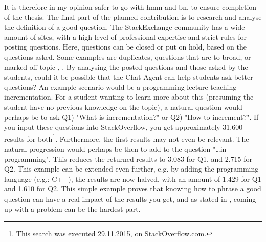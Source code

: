 It is therefore in my opinion safer to go with \gls{hmm} and \gls{bn}, to ensure completion of the thesis.
\vspace{0.5em}\newline
The final part of the planned contribution is to research and analyse the definition of a good question. The StackExchange community has a wide amount of sites, with a high level 
of professional expertise and strict rules for posting questions. Here, questions can be closed or put on hold, based on the questions asked. Some examples are duplicates, questions 
that are to broad, or marked off-topic \cite{Stackoverflow.com2015}, \cite{CommunityWiki2015}. By analysing the posted questions and those asked by the students, could it be possible 
that the Chat Agent can help students ask better questions? An example scenario would be a programming lecture teaching incrementation. For a student wanting to learn more about this 
(presuming the student have no previous knowledge on the topic), a natural question would perhaps be to ask Q1) "What is incrementation?" or Q2) "How to increment?". If you input 
these questions into StackOverflow, you get approximately 31.600 results for both\footnote{This search was executed 29.11.2015, on StackOverflow.com.}. Furthermore, the first results 
may not even be relevant. The natural progression would perhaps be then to add to the question "\ldots in programming". This reduces the returned results to 3.083 for Q1, and 2.715 
for Q2. This example can be extended even further, e.g. by adding the programming language (e.g.: C++), the results are now halved, with an amount of 1.429 for Q1 and 1.610 for Q2. 
This simple example proves that knowing how to phrase a good question can have a real impact of the results you get, and as stated in \cite{Lucky2015}, coming up with a problem can be 
the hardest part.